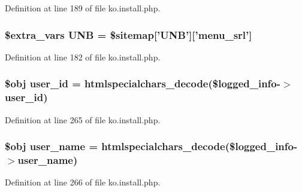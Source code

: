 Definition at line 189 of file ko.\-install.\-php.

\hypertarget{ko_8install_8php_abc0cb1f57d83d4a106f4495c30e0df52}{
\subsubsection[{U\-N\-B}]{\setlength{\rightskip}{0pt plus 5cm}\${\bf extra\-\_\-vars} U\-N\-B = \$sitemap\mbox{[}'U\-N\-B'\mbox{]}\mbox{[}'menu\-\_\-srl'\mbox{]}}}\label{ko_8install_8php_abc0cb1f57d83d4a106f4495c30e0df52}


Definition at line 182 of file ko.\-install.\-php.

\hypertarget{ko_8install_8php_a74f1a394389d774e5b4cd5d1d15413f7}{
\subsubsection[{user\-\_\-id}]{\setlength{\rightskip}{0pt plus 5cm}\$obj user\-\_\-id = htmlspecialchars\-\_\-decode(\$logged\-\_\-info-\/$>$user\-\_\-id)}}\label{ko_8install_8php_a74f1a394389d774e5b4cd5d1d15413f7}


Definition at line 265 of file ko.\-install.\-php.

\hypertarget{ko_8install_8php_a115401aff7da80e73c66e9f76505426b}{
\subsubsection[{user\-\_\-name}]{\setlength{\rightskip}{0pt plus 5cm}\$obj user\-\_\-name = htmlspecialchars\-\_\-decode(\$logged\-\_\-info-\/$>$user\-\_\-name)}}\label{ko_8install_8php_a115401aff7da80e73c66e9f76505426b}


Definition at line 266 of file ko.\-install.\-php.

